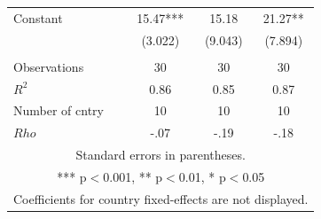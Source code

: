 \documentclass[12pt]{report}
\begin{document}
\begin{table}[htdp]
\begin{center}
{\begin{tabular}{lccc}
Constant & 15.47*** & 15.18 & 21.27** \\  & (3.022) &
(9.043) & (7.894) \\
 &  &  &
 \\ Observations & 30 & 30 & 30 \\ $R^2$ & 0.86 & 0.85 & 0.87
\\ Number of cntry & 10 & 10 & 10 \\  $Rho$ & -.07 & -.19 & -.18 \\ \hline
\multicolumn{4}{c}{ Standard errors in parentheses.} \\
\multicolumn{4}{c}{ *** p$<$0.001, ** p$<$0.01, * p$<$0.05} \\
\multicolumn{4}{c}{ Coefficients for country fixed-effects are not displayed.
} \\
\end{tabular}
} \end{center}
\label{default}
\end{table}
\end{document}
